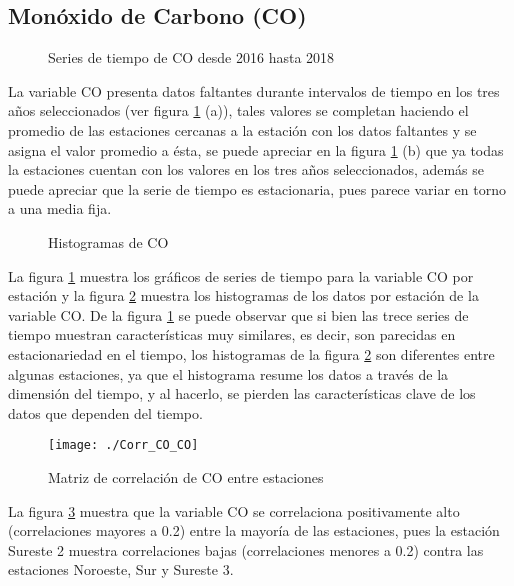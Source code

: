 \subsection{Monóxido de Carbono (CO)} 
\begin{figure}[H]
\centering
{}
\caption{Series de tiempo de CO desde 2016 hasta 2018}
\label{serieCO}
\end{figure}

La variable CO presenta datos faltantes durante intervalos de tiempo en los tres años seleccionados (ver figura \ref{serieCO} (a)), tales valores se completan haciendo el promedio de las estaciones cercanas a la estación con los datos faltantes  y se asigna el valor promedio a ésta, se puede apreciar en la figura \ref{serieCO} (b) que ya todas la estaciones cuentan con los valores en los tres años seleccionados, además se puede apreciar que la serie de tiempo es estacionaria, pues parece variar en torno a una media fija.

\begin{figure}[H]
\centering
{}
\caption{Histogramas de CO}
\label{histCO}
\end{figure}

La figura \ref{serieCO} muestra los gráficos de series de tiempo para la variable CO por estación y la figura \ref{histCO} muestra los histogramas de los datos por estación de la variable CO. De la figura \ref{serieCO} se puede observar que si bien las trece series de tiempo muestran características muy similares, es decir, son parecidas en estacionariedad en el tiempo, los histogramas de la figura \ref{histCO} son diferentes entre algunas estaciones, ya que el histograma resume los datos a través de la dimensión del tiempo, y al hacerlo, se pierden las características clave de los datos que dependen del tiempo.

\begin{figure}[H]
\centering
\texttt{[image: ./Corr\_CO\_CO]}
\caption{Matriz de correlación de CO entre estaciones}
\label{corrCOCO}
\end{figure}

La figura \ref{corrCOCO} muestra que la variable CO se correlaciona positivamente alto (correlaciones mayores a 0.2) entre la mayoría de las estaciones, pues la estación Sureste 2 muestra correlaciones bajas (correlaciones menores a 0.2) contra las estaciones Noroeste, Sur y Sureste 3.

